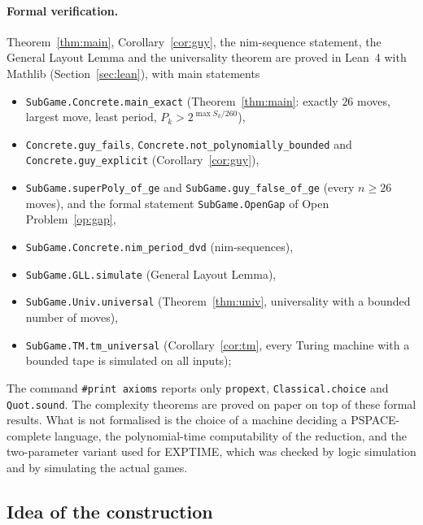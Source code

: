 \documentclass[11pt]{article}
\theoremstyle{definition}
\newcommand{\nmoves}{26}
\begin{document}
\paragraph{Formal verification.}  Theorem~\ref{thm:main}, Corollary~\ref{cor:guy}, the nim-sequence
statement, the General Layout Lemma and the universality theorem are proved in Lean~4 with Mathlib
(Section~\ref{sec:lean}), with main statements
\begin{itemize}
\item \texttt{SubGame.Concrete.main\_exact} (Theorem~\ref{thm:main}: exactly $\nmoves$ moves, largest move,
least period, $P_k>2^{\max S_k/260}$),
\item \texttt{Concrete.guy\_fails}, \texttt{Concrete.not\_polynomially\_bounded} and
\texttt{Concrete.guy\_explicit} (Corollary~\ref{cor:guy}),
\item \texttt{SubGame.superPoly\_of\_ge} and \texttt{SubGame.guy\_false\_of\_ge} (every $n\ge26$ moves), and
the formal statement \texttt{SubGame.OpenGap} of Open Problem~\ref{op:gap},
\item \texttt{SubGame.Concrete.nim\_period\_dvd} (nim-sequences),
\item \texttt{SubGame.GLL.simulate} (General Layout Lemma),
\item \texttt{SubGame.Univ.universal} (Theorem~\ref{thm:univ}, universality with a bounded number of
moves),
\item \texttt{SubGame.TM.tm\_universal} (Corollary~\ref{cor:tm}, every Turing machine with a bounded tape
is simulated on all inputs);
\end{itemize}
{\sloppy The command \texttt{\#print axioms} reports only \texttt{propext}, \texttt{Classical.choice} and \texttt{Quot.sound}.
The complexity theorems are proved on paper on top of these formal results.  What is not formalised is
the choice of a machine deciding a PSPACE-complete language, the polynomial-time computability of the
reduction, and the two-parameter variant used for EXPTIME, which was checked by logic simulation and by
simulating the actual games.\par}

\subsection{Idea of the construction}
\end{document}

